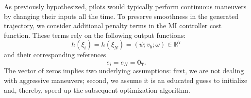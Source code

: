 As previously hypothesized, pilots would typically perform continuous maneuvers by changing their inputs all the time. To preserve smoothness in the generated trajectory, we consider additional penalty terms in the MI controller cost function. These terms rely on the following output functions:
\begin{equation}
	h(\xi_i) = h(\xi_N) = (\psi; v_b; \omega) \in \mathbb{R}^7
\end{equation}
and their corresponding references
\begin{equation}
	e_i = e_N = \mathbf{0_7}.
\end{equation}
The vector of zeros implies two underlying assumptions: first, we are not dealing with aggressive maneuvers; second, we assume it is an educated guess to initialize and, thereby, speed-up the subsequent optimization algorithm.